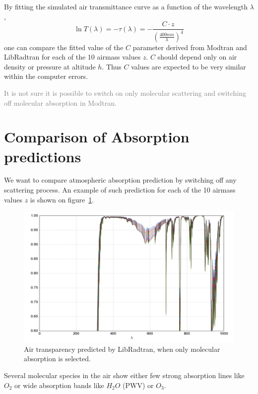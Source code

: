 \documentclass[a4paper]{article}
\begin{document}
By fitting the simulated air transmittance curve as a function of the wavelength $\lambda$, 
\begin{equation}
\ln T(\lambda)=-\tau(\lambda)=- \frac{C\cdot z}{\left( \frac{400 nm}{\lambda}\right)^4} 
\end{equation}
one can compare the fitted value of the $C$ parameter derived from Modtran and LibRadtran for each of the 10 airmass values $z$.
$C$ should depend only on air density or pressure at altitude $h$.
Thus $C$ values are expected to be very similar within the computer errors.


\textcolor{gray}{It is not sure it is possible to switch on only molecular scattering and switching off molecular absorption in Modtran.}

\section{Comparison of Absorption predictions}

We want to compare atmospheric absorption prediction by switching off any scattering process.
An example of such prediction for each of the 10 airmass values $z$ is shown on figure~\ref{fig:rt_absorption}.

\begin{figure}
\centering
\includegraphics[width=1\textwidth]{images/rt_absorption.png}
\caption{\label{fig:rt_absorption} Air transparency predicted by LibRadtran, when only molecular absorption is selected.}
\end{figure}
Several molecular species in the air show either few strong absorption lines like $O_2$ or wide absorption bands like $H_2O$ (PWV) or $O_3$.
\end{document}
